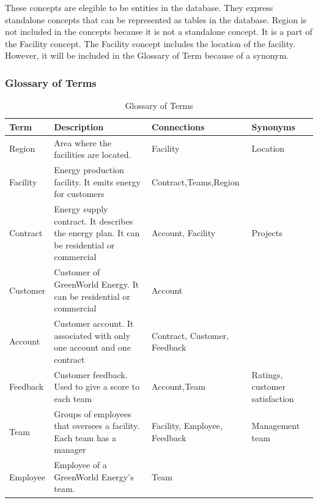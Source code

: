These concepts are elegible to be entities in the database. They express standalone concepts that can be represented as tables in the database. Region is not included in the concepts because it is not a standalone concept. It is a part of the Facility concept. The Facility concept includes the location of the facility. However, it will be included in the Glossary of Term because of a synonym.
    \subsubsection{Glossary of Terms}
    \begin{table}[H]
        \renewcommand{\arraystretch}{1.3} %
        \begin{tabularx}{\textwidth}{|X|X|X|X|}
        \hline
        \textbf{Term}& \textbf{Description}  & \textbf{Connections}    & \textbf{Synonyms}     \\ \hline
        Region      & Area where the facilities are located. & Facility     & Location \\ \hline
        Facility     & Energy production facility. It emits energy for customers      & Contract,Teams,Region         &\\ \hline
        Contract     & Energy supply contract. It describes the energy plan. It can be residential or commercial & Account, Facility     &  Projects        \\ \hline
        Customer     & Customer of GreenWorld Energy. It can be residential or commercial       & Account    &        \\ \hline
        Account      & Customer account. It associated with only one account and one contract & Contract, Customer, Feedback     &        \\ \hline
        Feedback     & Customer feedback. Used to give a score to each team       & Account,Team     &         Ratings, customer satisfaction \\\hline
        Team        & Groups of employees that oversees a facility. Each team has a manager       & Facility, Employee, Feedback     &  Management team       \\ \hline
        Employee     & Employee of a GreenWorld Energy's team.      & Team     &        \\ \hline
        \end{tabularx}
        \caption{Glossary of Terms}
        \end{table}
  
